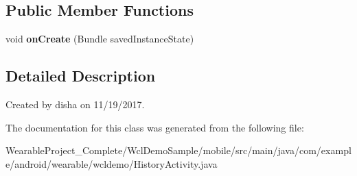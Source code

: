 \subsection*{Public Member Functions}
\begin{DoxyCompactItemize}
\item 
void {\bfseries on\+Create} (Bundle saved\+Instance\+State)\hypertarget{classcom_1_1example_1_1android_1_1wearable_1_1wcldemo_1_1HistoryActivity_aa76f8ef032749cb54e10794e1dbfd147}{}\label{classcom_1_1example_1_1android_1_1wearable_1_1wcldemo_1_1HistoryActivity_aa76f8ef032749cb54e10794e1dbfd147}

\end{DoxyCompactItemize}


\subsection{Detailed Description}
Created by disha on 11/19/2017. 

The documentation for this class was generated from the following file\+:\begin{DoxyCompactItemize}
\item 
Wearable\+Project\+\_\+\+Complete/\+Wcl\+Demo\+Sample/mobile/src/main/java/com/example/android/wearable/wcldemo/History\+Activity.\+java\end{DoxyCompactItemize}
